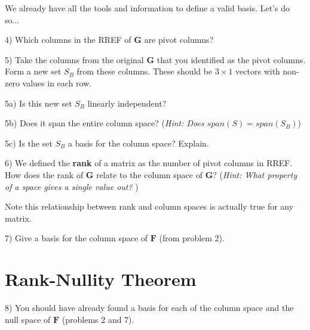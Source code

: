\documentclass{article}
\begin{document}
\begin{flushleft}
\vspace{1.5in}

We already have all the tools and information to define a valid basis. Let's do so...

\vspace{0.1in}

4) Which columns in the RREF of \textbf{G} are pivot columns?

\pagebreak

5) Take the columns from the original \textbf{G} that you identified as the pivot columns. Form a new set $S_{B}$ from these columns. These should be $3 \times 1$ vectors with non-zero values in each row.

\vspace{0.1in}

5a) Is this new set $S_{B}$ linearly independent?

\vspace{1.5in}

5b) Does it span the entire column space? (\textit{Hint: Does $span(S) = span (S_{B})$})

\vspace{1.5in}

5c) Is the set $S_{B}$ a basis for the column space? Explain.

\vspace{0.75in}

6) We defined the \textbf{rank} of a matrix as the number of pivot columns in RREF. How does the rank of \textbf{G} relate to the column space of \textbf{G}? (\textit{Hint: What property of a space gives a single value out?} )

\vspace{1in}

\Large Note this relationship between rank and column spaces is actually true for any matrix. \normalsize

\vspace{0.2in}

7) Give a basis for the column space of $\textbf{F}$ (from problem 2).

\newpage 

\section*{Rank-Nullity Theorem}
8) You should have already found a basis for each of the column space and the null space of $\textbf{F}$ (problems 2 and 7).

\vspace{0.2in}


\end{flushleft}
\end{document}
